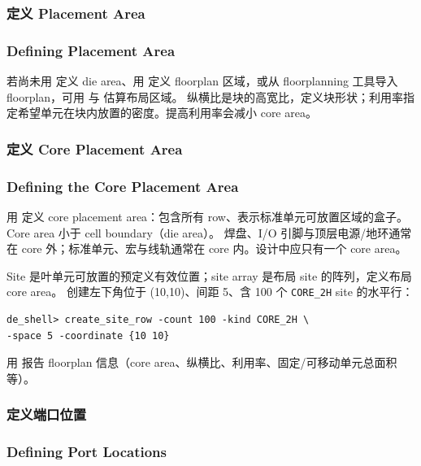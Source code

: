 \subsubsection{定义 Placement Area}
\subsubsection*{Defining Placement Area}

若尚未用  定义 die area、用  定义 floorplan 区域，或从 floorplanning 工具导入 floorplan，可用  与  估算布局区域。
纵横比是块的高宽比，定义块形状；利用率指定希望单元在块内放置的密度。提高利用率会减小 core area。


\subsubsection{定义 Core Placement Area}
\subsubsection*{Defining the Core Placement Area}

用  定义 core placement area：包含所有 row、表示标准单元可放置区域的盒子。Core area 小于 cell boundary（die area）。
焊盘、I/O 引脚与顶层电源/地环通常在 core 外；标准单元、宏与线轨通常在 core 内。设计中应只有一个 core area。

Site 是叶单元可放置的预定义有效位置；site array 是布局 site 的阵列，定义布局 core area。
创建左下角位于 (10,10)、间距 5、含 100 个 \texttt{CORE\_2H} site 的水平行：
\begin{lstlisting}
de_shell> create_site_row -count 100 -kind CORE_2H \
-space 5 -coordinate {10 10}
\end{lstlisting}

用  报告 floorplan 信息（core area、纵横比、利用率、固定/可移动单元总面积等）。

\subsubsection{定义端口位置}
\subsubsection*{Defining Port Locations}

